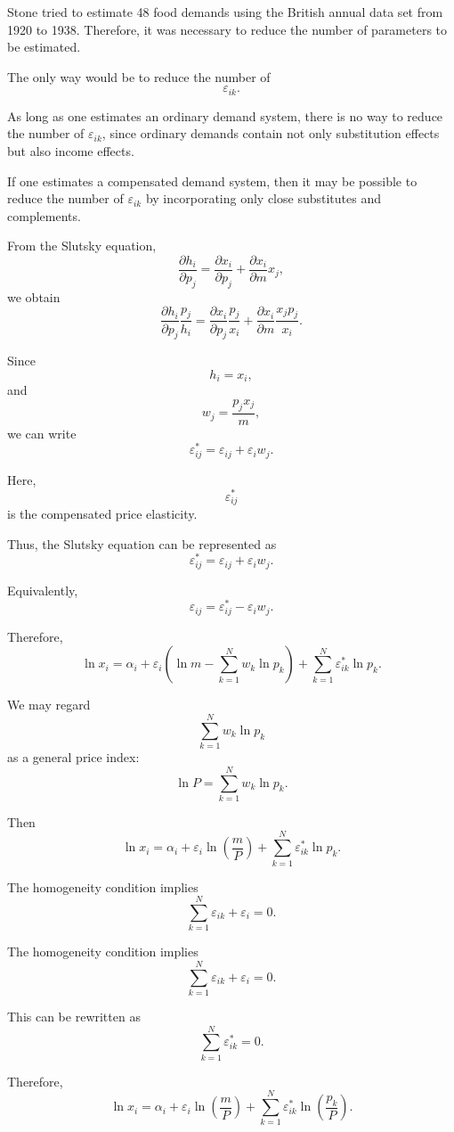Stone tried to estimate 48 food demands using the British annual data set from 1920 to 1938. Therefore, it was necessary to reduce the number of parameters to be estimated.

The only way would be to reduce the number of
\[
\varepsilon_{ik}.
\]

As long as one estimates an ordinary demand system, there is no way to reduce the number of \(\varepsilon_{ik}\), since ordinary demands contain not only substitution effects but also income effects.

If one estimates a compensated demand system, then it may be possible to reduce the number of \(\varepsilon_{ik}\) by incorporating only close substitutes and complements.

From the Slutsky equation,
\[
\frac{\partial h_i}{\partial p_j}
=
\frac{\partial x_i}{\partial p_j}
+
\frac{\partial x_i}{\partial m}x_j,
\]
we obtain
\[
\frac{\partial h_i}{\partial p_j}
\frac{p_j}{h_i}
=
\frac{\partial x_i}{\partial p_j}
\frac{p_j}{x_i}
+
\frac{\partial x_i}{\partial m}
\frac{x_jp_j}{x_i}.
\]

Since
\[
h_i=x_i,
\]
and
\[
w_j=\frac{p_jx_j}{m},
\]
we can write
\[
\varepsilon_{ij}^*
=
\varepsilon_{ij}
+
\varepsilon_i w_j.
\]

Here,
\[
\varepsilon_{ij}^*
\]
is the compensated price elasticity.

Thus, the Slutsky equation can be represented as
\[
\varepsilon_{ij}^*
=
\varepsilon_{ij}
+
\varepsilon_i w_j.
\]

Equivalently,
\[
\varepsilon_{ij}
=
\varepsilon_{ij}^*
-
\varepsilon_i w_j.
\]

Therefore,
\[
\ln x_i
=
\alpha_i
+
\varepsilon_i
\left(
\ln m
-
\sum_{k=1}^N w_k\ln p_k
\right)
+
\sum_{k=1}^N
\varepsilon_{ik}^*
\ln p_k.
\]

We may regard
\[
\sum_{k=1}^N w_k\ln p_k
\]
as a general price index:
\[
\ln P
=
\sum_{k=1}^N w_k\ln p_k.
\]

Then
\[
\ln x_i
=
\alpha_i
+
\varepsilon_i
\ln\left(\frac{m}{P}\right)
+
\sum_{k=1}^N
\varepsilon_{ik}^*
\ln p_k.
\]

The homogeneity condition implies
\[
\sum_{k=1}^N \varepsilon_{ik}
+
\varepsilon_i
=
0.
\]



The homogeneity condition implies
\[
\sum_{k=1}^N \varepsilon_{ik}+\varepsilon_i=0.
\]

This can be rewritten as
\[
\sum_{k=1}^N \varepsilon_{ik}^*=0.
\]

Therefore,
\[
\ln x_i
=
\alpha_i
+
\varepsilon_i\ln\left(\frac{m}{P}\right)
+
\sum_{k=1}^N
\varepsilon_{ik}^*
\ln\left(\frac{p_k}{P}\right).
\]

